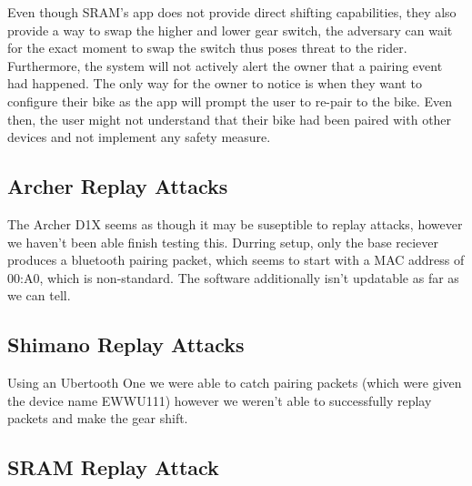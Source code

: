 \documentclass[letterpaper,twocolumn,10pt]{article}
\begin{document}
Even though SRAM's app does not provide direct shifting capabilities, they also provide a way to swap the higher and lower gear switch, the adversary can wait for the exact moment to swap the switch thus poses threat to the rider. Furthermore, the system will not actively alert the owner that a pairing event had happened. The only way for the owner to notice is when they want to configure their bike as the app will prompt the user to re-pair to the bike. Even then, the user might not understand that their bike had been paired with other devices and not implement any safety measure.


\subsection{Archer Replay Attacks}

The Archer D1X seems as though it may be suseptible to replay attacks, however we haven't been able finish testing this. Durring setup, only the base reciever produces a bluetooth pairing packet, which seems to start with a MAC address of 00:A0, which is non-standard. The software additionally isn't updatable as far as we can tell.

\subsection{Shimano Replay Attacks}

Using an Ubertooth One we were able to catch pairing packets (which were given the device name EWWU111) however we weren't able to successfully replay packets and make the gear shift.

\subsection{SRAM Replay Attack}
\end{document}
